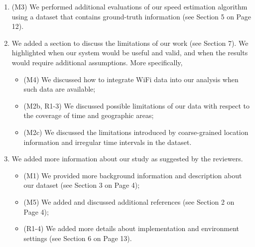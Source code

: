 \begin{enumerate}

\item (M3) %
We performed additional evaluations of our speed estimation algorithm using a dataset that contains ground-truth information (see Section 5 on Page 12).

\item We added a section to discuss the limitations of our work (see Section 7). We highlighted when our system would be useful and valid, and when the results would require additional assumptions. More specifically, 
	\begin{itemize}
    \item (M4) We discussed how to integrate WiFi data into our analysis when such data are available; %
    \item (M2b, R1-3) We discussed possible limitations of our data with respect to the coverage of time and %
    geographic areas; %
	\item (M2c) We discussed the limitations introduced by coarse-grained location information and irregular time intervals in the dataset. %
\end{itemize}

\item We added more information about our study as suggested by the reviewers.
	\begin{itemize}
	\item (M1) We provided more background information and description about our dataset (see Section 3 on Page 4);
  	\item (M5) We added and discussed additional references (see Section 2 on Page 4);
  	\item (R1-4) We added more details about implementation and environment settings (see Section 6 on Page 13).
\end{itemize}


\end{enumerate}
